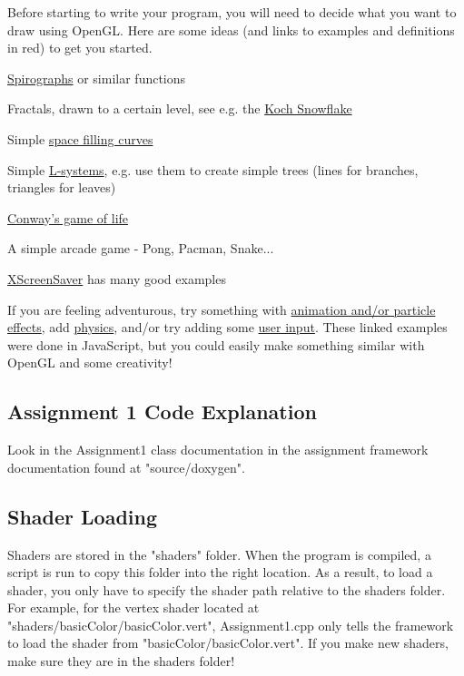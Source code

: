 \documentclass{article}
\begin{document}
Before starting to write your program, you will need to decide what you want to draw using OpenGL. Here are some ideas (and links to examples and definitions in red) to get you started.
\begin{itemize*}
\item \href{http://mathworld.wolfram.com/Spirograph.html}{Spirographs} or similar functions
\item Fractals, drawn to a certain level, see e.g. the \href{http://en.wikipedia.org/wiki/Koch_snowflake}{Koch Snowflake}
\item Simple \href{http://en.wikipedia.org/wiki/Space-filling_curve}{space filling curves}
\item Simple \href{http://en.wikipedia.org/wiki/L-system}{L-systems}, e.g. use them to create simple trees (lines for branches, triangles for leaves)
\item \href{http://en.wikipedia.org/wiki/Conway's_Game_of_Life}{Conway's game of life}
\item A simple arcade game - Pong, Pacman, Snake...
\item \href{http://www.jwz.org/xscreensaver/screenshots/}{XScreenSaver} has many good examples
\item If you are feeling adventurous, try something with \href{http://9elements.com/io/projects/html5/canvas/}{animation and/or particle effects}, add \href{http://hakim.se/experiments/html5/magnetic/02/}{physics}, and/or try adding some \href{http://hakim.se/experiments/html5/particles/02/}{user input}. These linked examples were done in JavaScript, but you could easily make something similar with OpenGL and some creativity!
\end{itemize*}

\subsection*{Assignment 1 Code Explanation}

Look in the Assignment1 class documentation in the assignment framework documentation found at "source/doxygen".

\subsection*{Shader Loading}

Shaders are stored in the "shaders" folder. When the program is compiled, a script is run to copy this folder into the right location. As a result, to load a shader, you only have to specify the shader path relative to the shaders folder. For example, for the vertex shader located at "shaders/basicColor/basicColor.vert", Assignment1.cpp only tells the framework to load the shader from "basicColor/basicColor.vert". If you make new shaders, make sure they are in the shaders folder!
\end{document}
